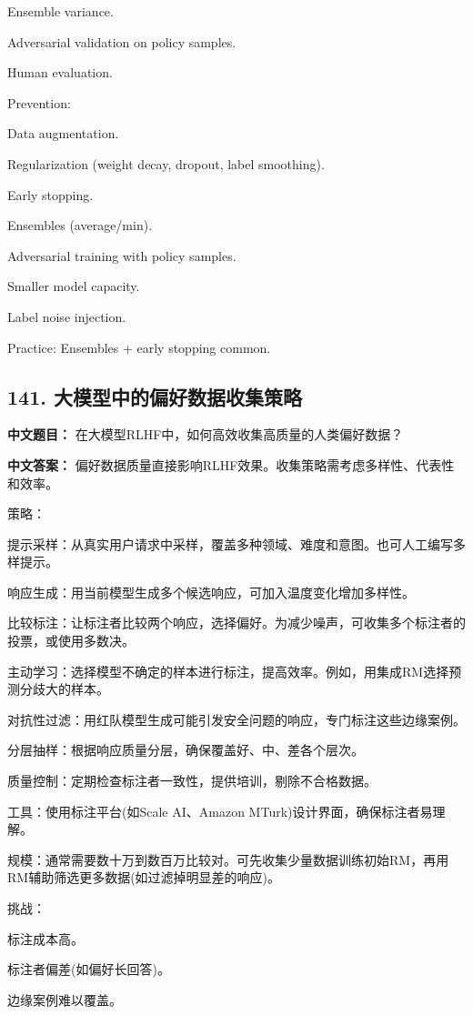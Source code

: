 \documentclass[10pt,a4paper]{ctexart}
\begin{document}
Ensemble variance.

Adversarial validation on policy samples.

Human evaluation.

Prevention:

Data augmentation.

Regularization (weight decay, dropout, label smoothing).

Early stopping.

Ensembles (average/min).

Adversarial training with policy samples.

Smaller model capacity.

Label noise injection.

Practice: Ensembles + early stopping common.

\subsection*{141. 大模型中的偏好数据收集策略}
\textbf{中文题目：} 在大模型RLHF中，如何高效收集高质量的人类偏好数据？

\textbf{中文答案：}
偏好数据质量直接影响RLHF效果。收集策略需考虑多样性、代表性和效率。

策略：

提示采样：从真实用户请求中采样，覆盖多种领域、难度和意图。也可人工编写多样提示。

响应生成：用当前模型生成多个候选响应，可加入温度变化增加多样性。

比较标注：让标注者比较两个响应，选择偏好。为减少噪声，可收集多个标注者的投票，或使用多数决。

主动学习：选择模型不确定的样本进行标注，提高效率。例如，用集成RM选择预测分歧大的样本。

对抗性过滤：用红队模型生成可能引发安全问题的响应，专门标注这些边缘案例。

分层抽样：根据响应质量分层，确保覆盖好、中、差各个层次。

质量控制：定期检查标注者一致性，提供培训，剔除不合格数据。

工具：使用标注平台(如Scale AI、Amazon MTurk)设计界面，确保标注者易理解。

规模：通常需要数十万到数百万比较对。可先收集少量数据训练初始RM，再用RM辅助筛选更多数据(如过滤掉明显差的响应)。

挑战：

标注成本高。

标注者偏差(如偏好长回答)。

边缘案例难以覆盖。
\end{document}
